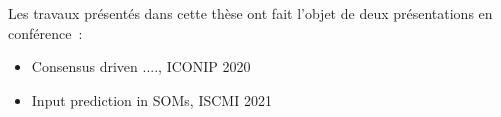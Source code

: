 





Les travaux présentés dans cette thèse ont fait l'objet de deux présentations en conférence~:
\begin{itemize}
    \item Consensus driven ...., ICONIP 2020
    \item Input prediction in SOMs, ISCMI 2021
\end{itemize}





